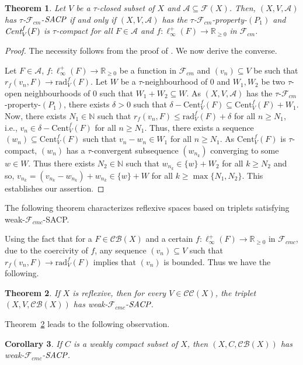 \documentclass[11pt]{amsart}
\newtheorem{thm}{Theorem}[section]
\newtheorem{cor}[thm]{Corollary}
\newcommand{\ra}{\rightarrow}
\newcommand{\ci}{\subseteq}
\newcommand{\de}{\delta}
\newcommand{\mb}{\mathbb}
\newcommand{\mc}{\mathcal}
\newcommand{\mr}{\mathscr}
\newcommand{\iy}{\infty}
\newcommand{\trC}{\textrm{Cent}}
\newcommand{\trr}{\textrm{rad}}
\newcommand{\emC}{\emph{Cent}}
\newcommand{\eSACP}{\bf{\emph{SACP}}}
\begin{document}
\begin{thm}\label{T2}
Let $V$ be a $\tau$-closed subset of $X$ and $\mc{A}\ci \mc{F}(X)$. Then, $(X,V,\mc{A})$ has $\tau$-$\mr{F}_{cm}$-$\eSACP$ if and only if $(X,V,\mc{A})$ has the $\tau$-$\mr{F}_{cm}$-property-$(P_1)$ and $\emC_V^f(F)$ is $\tau$-compact for all $F\in \mc{A}$ and $f:\ell_\iy^+(F)\ra\mb{R}_{\geq0}$ in $\mr{F}_{cm}$.
\end{thm}
\begin{proof}
The necessity follows from the proof of \cite[Thereom~2.2]{PB}. We now derive the converse.

Let $F\in\mc{A}$, $f:\ell_\iy^+(F)\ra\mb{R}_{\geq0}$ be a function in $\mr{F}_{cm}$ and $(v_n)\ci V$ be such that $r_f(v_n,F)\ra\trr_V^f(F)$. Let $W$ be a $\tau$-neighbourhood of $0$ and $W_1,W_2$ be two $\tau$-open neighbourhoods of $0$ such that $W_1+W_2\ci W$. As $(X,V,\mc{A})$ has the $\tau$-$\mr{F}_{cm}$-property-$(P_1)$, there exists $\de>0$ such that $\de-\trC_V^f(F)\ci\trC_V^f(F)+W_1$. Now, there exists $N_1\in\mb{N}$ such that $r_f(v_n,F)\leq\trr_V^f(F)+\de$ for all $n\geq N_1$, i.e., $v_n\in \de-\trC_V^f(F)$ for all $n\geq N_1$. Thus, there exists a sequence $(w_n)\ci\trC_V^f(F)$ such that $v_n-w_n\in W_1$ for all $n\geq N_1$. As $\trC_V^f(F)$ is $\tau$-compact, $(w_n)$ has a $\tau$-convergent subsequence $(w_{n_k})$ converging to some $w\in W$. Thus there exists $N_2\in\mb{N}$ such that $w_{n_k}\in \{w\}+W_2$ for all $k\geq N_2$ and so, $v_{n_k}=(v_{n_k}-w_{n_k})+w_{n_k}\in \{w\}+W$ for all $k\geq \max\{N_1,N_2\}$. This establishes our assertion.
\end{proof}

The following theorem characterizes reflexive spaces based on triplets satisfying weak-$\mr{F}_{cmc}$-SACP.

Using the fact that for a $F\in\mc{CB}(X)$ and a certain $f:\ell_\iy^+(F)\ra\mb{R}_{\geq0}$ in $\mr{F}_{cmc}$, due to the coercivity of $f$, any sequence $(v_n)\ci V$ such that $r_f(v_n,F)\ra\trr_V^f(F)$ implies that $(v_n)$ is bounded. Thus we have the following.
\begin{thm}\label{T4}
 If $X$ is reflexive, then for every $V\in\mc{CC}(X)$, the triplet $(X,V,\mc{CB}(X))$ has weak-$\mr{F}_{cmc}$-$\eSACP$.
\end{thm}
 Theorem~\ref{T4} leads to the following observation.
\begin{cor}\label{P2}
If $C$ is a weakly compact subset of $X$, then $(X,C,\mc{CB}(X))$ has weak-$\mr{F}_{cmc}$-$\eSACP$.
\end{cor}
\end{document}
